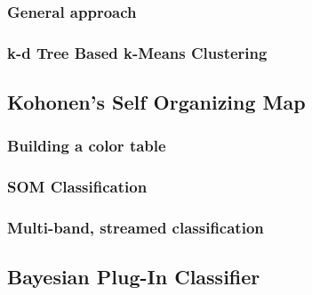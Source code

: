 \subsubsection{General approach}
\ifitkFullVersion

\fi

\subsubsection{k-d Tree Based k-Means Clustering}
\label{sec:KdTreeBasedKMeansClustering}
\ifitkFullVersion

\fi
\subsection{Kohonen's Self Organizing Map}
\label{sec:SOM}

\subsubsection{Building a color table}
\label{sec:SOMColorTable}

\subsubsection{SOM Classification}
\label{sec:SOMClassification}


\subsubsection{Multi-band, streamed classification}

\ifitkFullVersion

\fi


\subsection{Bayesian Plug-In Classifier}
\label{sec:BayesianPluginClassifier}

\ifitkFullVersion

\fi

